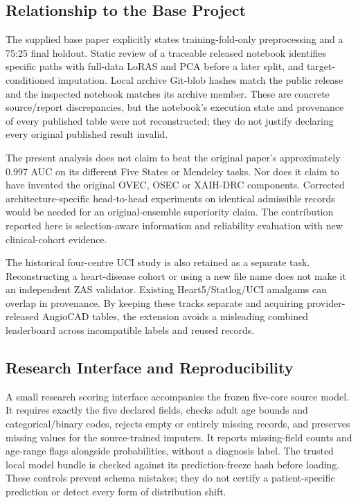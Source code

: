 \documentclass[conference]{IEEEtran}
\begin{document}
\subsection{Relationship to the Base Project}
The supplied base paper explicitly states training-fold-only preprocessing and a 75:25 final holdout. Static review of a traceable released notebook identifies specific paths with full-data LoRAS and PCA before a later split, and target-conditioned imputation. Local archive Git-blob hashes match the public release and the inspected notebook matches its archive member. These are concrete source/report discrepancies, but the notebook's execution state and provenance of every published table were not reconstructed; they do not justify declaring every original published result invalid.

The present analysis does not claim to beat the original paper's approximately 0.997 AUC on its different Five States or Mendeley tasks. Nor does it claim to have invented the original OVEC, OSEC or XAIH-DRC components. Corrected architecture-specific head-to-head experiments on identical admissible records would be needed for an original-ensemble superiority claim. The contribution reported here is selection-aware information and reliability evaluation with new clinical-cohort evidence.

The historical four-centre UCI study is also retained as a separate task. Reconstructing a heart-disease cohort or using a new file name does not make it an independent ZAS validator. Existing Heart5/Statlog/UCI amalgams can overlap in provenance. By keeping these tracks separate and acquiring provider-released AngioCAD tables, the extension avoids a misleading combined leaderboard across incompatible labels and reused records.

\subsection{Research Interface and Reproducibility}
A small research scoring interface accompanies the frozen five-core source model. It requires exactly the five declared fields, checks adult age bounds and categorical/binary codes, rejects empty or entirely missing records, and preserves missing values for the source-trained imputers. It reports missing-field counts and age-range flags alongside probabilities, without a diagnosis label. The trusted local model bundle is checked against its prediction-freeze hash before loading. These controls prevent schema mistakes; they do not certify a patient-specific prediction or detect every form of distribution shift.
\end{document}
